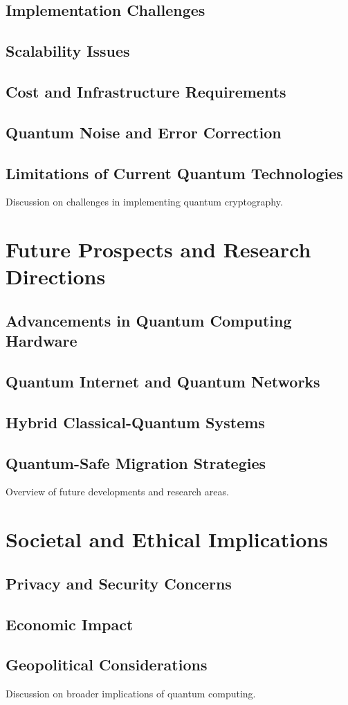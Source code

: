 \documentclass{report}
\begin{document}
\section{Implementation Challenges}
\section{Scalability Issues}
\section{Cost and Infrastructure Requirements}
\section{Quantum Noise and Error Correction}
\section{Limitations of Current Quantum Technologies}
Discussion on challenges in implementing quantum cryptography.

\chapter{Future Prospects and Research Directions}
\section{Advancements in Quantum Computing Hardware}
\section{Quantum Internet and Quantum Networks}
\section{Hybrid Classical-Quantum Systems}
\section{Quantum-Safe Migration Strategies}
Overview of future developments and research areas.


\chapter{Societal and Ethical Implications}
\section{Privacy and Security Concerns}
\section{Economic Impact}
\section{Geopolitical Considerations}
Discussion on broader implications of quantum computing.


\newpage
\printbibliography[title={Sources}]
\end{document}
